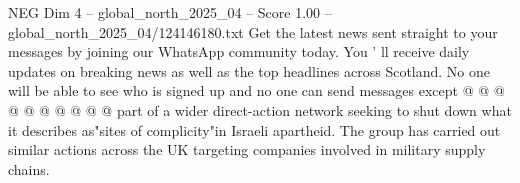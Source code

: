 \begin{textsample}{NEG Dim 4 – global\_north\_2025\_04 – Score 1.00 – global\_north\_2025\_04/124146180.txt}
Get the latest news sent straight to your messages by joining our WhatsApp community today.
You ' ll receive daily updates on breaking news as well as the top headlines across Scotland.
No one will be able to see who is signed up and no one can send messages except @ @ @ @ @ @ @ @ @ @ part of a wider direct-action network seeking to shut down what it describes as"sites of complicity"in Israeli apartheid.
The group has carried out similar actions across the UK targeting companies involved in military supply chains.

\end{textsample}
